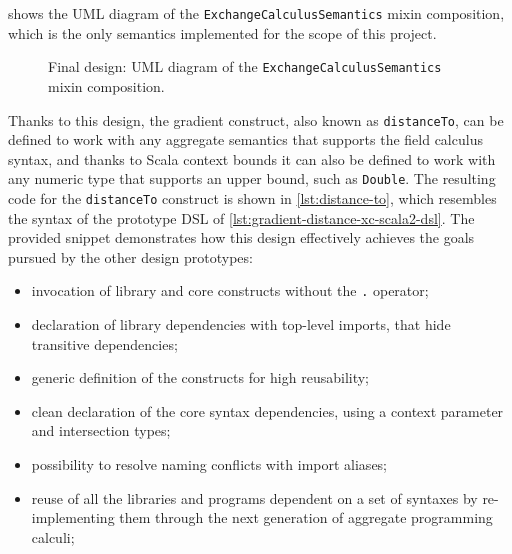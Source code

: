  shows the \ac{UML} diagram of the \texttt{ExchangeCalculusSemantics} mixin composition, which is the only semantics implemented for the scope of this project.

\begin{figure}
    \centering
    \caption{Final design: \ac{UML} diagram of the \texttt{ExchangeCalculusSemantics} mixin composition.}
    \label{fig:final-design-exchange-calculus-semantics-diagram}
    \bigskip
    \resizebox{\linewidth}{!}{
        
    }
\end{figure}

Thanks to this design, the gradient construct, also known as \texttt{distanceTo}, can be defined to work with any aggregate semantics that supports the field calculus syntax, and thanks to Scala context bounds it can also be defined to work with any numeric type that supports an upper bound, such as \texttt{Double}.
%
The resulting code for the \texttt{distanceTo} construct is shown in \cref{lst:distance-to}, which resembles the syntax of the prototype \ac{DSL} of \cref{lst:gradient-distance-xc-scala2-dsl}.
%
The provided snippet demonstrates how this design effectively achieves the goals pursued by the other design prototypes:
\begin{itemize}
    \item invocation of library and core constructs without the \texttt{.} operator;
    \item declaration of library dependencies with top-level imports, that hide transitive dependencies;
    \item generic definition of the constructs for high reusability;
    \item clean declaration of the core syntax dependencies, using a  context parameter and intersection types;
    \item possibility to resolve naming conflicts with import aliases;
    \item reuse of all the libraries and programs dependent on a set of syntaxes by re-implementing them through the next generation of aggregate programming calculi;
\end{itemize}



